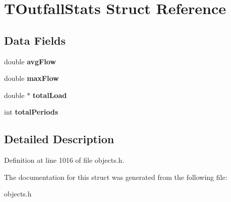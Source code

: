 \hypertarget{struct_t_outfall_stats}{}\section{T\+Outfall\+Stats Struct Reference}
\label{struct_t_outfall_stats}
\subsection*{Data Fields}
\begin{DoxyCompactItemize}
\item 
\mbox{\label{struct_t_outfall_stats_a77b6f99fc6b2e62a3c492efdaa8dadd3}} 
double {\bfseries avg\+Flow}
\item 
\mbox{\label{struct_t_outfall_stats_a50e437bc9d75ebd303d3e48e56416ad3}} 
double {\bfseries max\+Flow}
\item 
\mbox{\label{struct_t_outfall_stats_ae3d8bf0ee03b205afb121782c4664ba8}} 
double $\ast$ {\bfseries total\+Load}
\item 
\mbox{\label{struct_t_outfall_stats_af0680eda9c338e25e4879863bd9e063c}} 
int {\bfseries total\+Periods}
\end{DoxyCompactItemize}


\subsection{Detailed Description}


Definition at line 1016 of file objects.\+h.



The documentation for this struct was generated from the following file\+:\begin{DoxyCompactItemize}
\item 
objects.\+h\end{DoxyCompactItemize}
